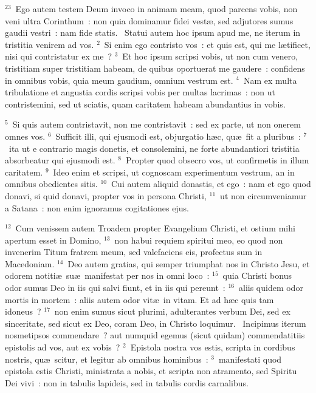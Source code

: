 ${}^{23}$~Ego autem testem Deum invoco in animam meam, quod parcens vobis, non veni ultra Corinthum~: non quia dominamur fidei vest\ae , sed adjutores sumus gaudii vestri~: nam fide statis.
~\lettrine[lines=10,image=true,loversize=0.05,lraise=-0.03]{S}{}tatui autem hoc ipsum apud me, ne iterum in tristitia venirem ad vos.
${}^{2}$~Si enim ego contristo vos~: et quis est, qui me l\ae tificet, nisi qui contristatur ex me~?
${}^{3}$~Et hoc ipsum scripsi vobis, ut non cum venero, tristitiam super tristitiam habeam, de quibus oportuerat me gaudere~: confidens in omnibus vobis, quia meum gaudium, omnium vestrum est.
${}^{4}$~Nam ex multa tribulatione et angustia cordis scripsi vobis per multas lacrimas~: non ut contristemini, sed ut sciatis, quam caritatem habeam abundantius in vobis.


${}^{5}$~Si quis autem contristavit, non me contristavit~: sed ex parte, ut non onerem omnes vos.
${}^{6}$~Sufficit illi, qui ejusmodi est, objurgatio h\ae c, qu\ae\ fit a pluribus~:
${}^{7}$~ita ut e contrario magis donetis, et consolemini, ne forte abundantiori tristitia absorbeatur qui ejusmodi est.
${}^{8}$~Propter quod obsecro vos, ut confirmetis in illum caritatem.
${}^{9}$~Ideo enim et scripsi, ut cognoscam experimentum vestrum, an in omnibus obedientes sitis.
${}^{10}$~Cui autem aliquid donastis, et ego~: nam et ego quod donavi, si quid donavi, propter vos in persona Christi,
${}^{11}$~ut non circumveniamur a Satana~: non enim ignoramus cogitationes ejus.


${}^{12}$~Cum venissem autem Troadem propter Evangelium Christi, et ostium mihi apertum esset in Domino,
${}^{13}$~non habui requiem spiritui meo, eo quod non invenerim Titum fratrem meum, sed valefaciens eis, profectus sum in Macedoniam.
${}^{14}$~Deo autem gratias, qui semper triumphat nos in Christo Jesu, et odorem notiti\ae\ su\ae\ manifestat per nos in omni loco~:
${}^{15}$~quia Christi bonus odor sumus Deo in iis qui salvi fiunt, et in iis qui pereunt~:
${}^{16}$~aliis quidem odor mortis in mortem~: aliis autem odor vit\ae\ in vitam. Et ad h\ae c quis tam idoneus~?
${}^{17}$~non enim sumus sicut plurimi, adulterantes verbum Dei, sed ex sinceritate, sed sicut ex Deo, coram Deo, in Christo loquimur.
~\lettrine[lines=10,image=true,loversize=0.05,lraise=-0.03]{I}{}ncipimus iterum nosmetipsos commendare~? aut numquid egemus (sicut quidam) commendatitiis epistolis ad vos, aut ex vobis~?
${}^{2}$~Epistola nostra vos estis, scripta in cordibus nostris, qu\ae\ scitur, et legitur ab omnibus hominibus~:
${}^{3}$~manifestati quod epistola estis Christi, ministrata a nobis, et scripta non atramento, sed Spiritu Dei vivi~: non in tabulis lapideis, sed in tabulis cordis carnalibus.


